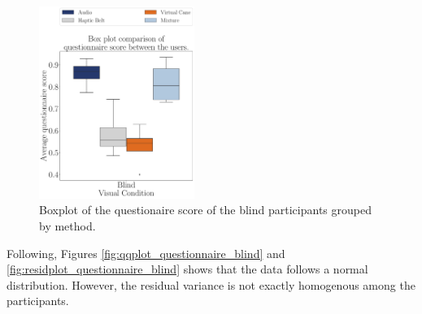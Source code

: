 \begin{figure}[!htb]
    \centering
    \includegraphics[width = 0.45\textwidth]{Resultados/Questionario/Figuras/pdf/boxplot_questionnaire_scene_blind.pdf}
    \caption{Boxplot of the questionaire score of the blind participants grouped by method.}
    \label{fig:boxplot_quest_blind_scene}
\end{figure}

%
%

Following, Figures \ref{fig:qqplot_questionnaire_blind} and \ref{fig:residplot_questionnaire_blind} shows that the data follows a normal distribution. However, the residual variance is not exactly homogenous among the participants. 


